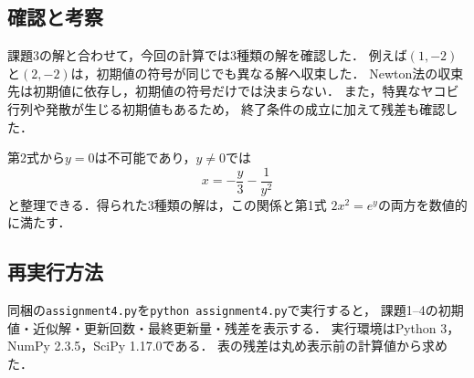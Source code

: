 \documentclass[a4paper,10pt]{article}
\begin{document}
\subsection*{確認と考察}
課題3の解と合わせて，今回の計算では3種類の解を確認した．
例えば$(1,-2)$と$(2,-2)$は，初期値の符号が同じでも異なる解へ収束した．
Newton法の収束先は初期値に依存し，初期値の符号だけでは決まらない．
また，特異なヤコビ行列や発散が生じる初期値もあるため，
終了条件の成立に加えて残差も確認した．

第2式から$y=0$は不可能であり，$y\ne0$では
\[
  x=-\frac{y}{3}-\frac{1}{y^2}
\]
と整理できる．得られた3種類の解は，この関係と第1式
$2x^2=e^y$の両方を数値的に満たす．

\subsection*{再実行方法}
同梱の\texttt{assignment4.py}を\texttt{python assignment4.py}で実行すると，
課題1--4の初期値・近似解・更新回数・最終更新量・残差を表示する．
実行環境はPython 3，NumPy 2.3.5，SciPy 1.17.0である．
表の残差は丸め表示前の計算値から求めた．
\end{document}
